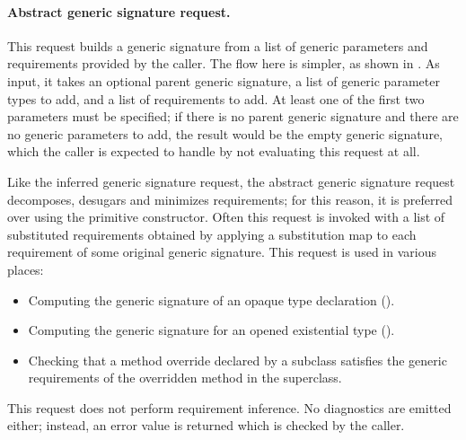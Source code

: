 \documentclass[../generics]{subfiles}
\begin{document}
\paragraph{Abstract generic signature request.}
This request builds a generic signature from a list of generic parameters and requirements provided by the caller. The flow here is simpler, as shown in . As input, it takes an optional parent generic signature, a list of generic parameter types to add, and a list of requirements to add. At least one of the first two parameters must be specified; if there is no parent generic signature and there are no generic parameters to add, the result would be the empty generic signature, which the caller is expected to handle by not evaluating this request at all.

Like the inferred generic signature request, the abstract generic signature request decomposes, desugars and minimizes requirements; for this reason, it is preferred over using the primitive constructor. Often this request is invoked with a list of substituted requirements obtained by applying a substitution map to each requirement of some original generic signature. This request is used in various places:
\begin{itemize}
\item Computing the generic signature of an opaque type declaration ().
\item Computing the generic signature for an opened existential type ().
\item Checking that a method override declared by a subclass satisfies the generic requirements of the overridden method in the superclass.
\end{itemize}

This request does not perform requirement inference. No diagnostics are emitted either; instead, an error value is returned which is checked by the caller.
\end{document}
